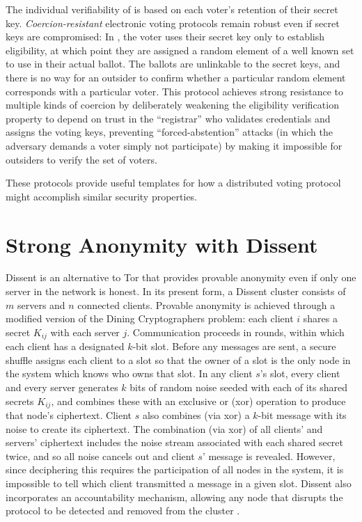     The individual verifiability of \cite{neff_verifiable_2001} is based on each
    voter's retention of their secret key. \emph{Coercion-resistant} electronic
    voting protocols remain robust even if secret keys are compromised: In
    \cite{juels_coercion-resistant_2005}, the voter uses their secret key only
    to establish eligibility, at which point they are assigned a random element
    of a well known set to use in their actual ballot. The ballots are
    unlinkable to the secret keys, and there is no way for an outsider to
    confirm whether a particular random element corresponds with a particular
    voter. This protocol achieves strong resistance to multiple kinds of
    coercion by deliberately weakening the eligibility verification property to
    depend on trust in the ``registrar'' who validates credentials and assigns the
    voting keys, preventing ``forced-abstention'' attacks (in which the adversary
    demands a voter simply not participate) by making it impossible for
    outsiders to verify the set of voters.

    These protocols provide useful templates for how a distributed voting
    protocol might accomplish similar security properties.


\section{Strong Anonymity with Dissent}
  \label{Subsection:Dissent}
    Dissent is an alternative to Tor that provides provable anonymity even if
    only one server in the network is honest\cite{corrigan-gibbs_dissent:_2010}.
    In its present form, a Dissent cluster consists of $m$ servers and $n$
    connected clients\cite{wolinsky_dissent_2012}. Provable anonymity is
    achieved through a modified version of the Dining Cryptographers
    problem\cite{chaum_dining_1988}: each client $i$ shares a secret $K_{ij}$
    with each server $j$. Communication proceeds in rounds, within which each
    client has a designated $k$-bit slot.  Before any messages are sent, a
    secure shuffle\cite{neff_verifiable_2001} assigns each client to a slot so
    that the owner of a slot is the only node in the system which knows who owns
    that slot.  In any client $s$'s slot, every client and every server
    generates $k$ bits of random noise seeded with each of its shared secrets
    $K_{ij}$, and combines these with an exclusive or (xor) operation to produce
    that node's ciphertext. Client $s$ also combines (via xor) a $k$-bit message
    with its noise to create its ciphertext. The combination (via xor) of all
    clients' and servers' ciphertext includes the noise stream associated with
    each shared secret twice, and so all noise cancels out and client $s$'
    message is revealed. However, since deciphering this requires the
    participation of all nodes in the system, it is impossible to tell which
    client transmitted a message in a given slot. Dissent also incorporates an
    accountability mechanism, allowing any node that disrupts the protocol to be
    detected and removed from the cluster
    \cite{corrigan-gibbs_proactively_2013}.

